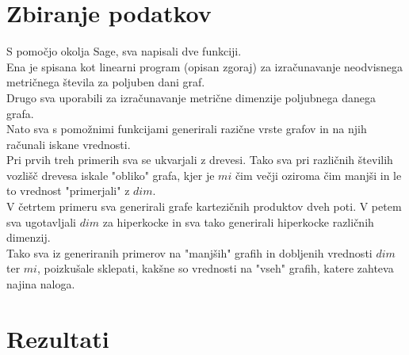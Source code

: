 \documentclass[a4paper]{article}
\begin{document}
\section{Zbiranje podatkov}
S pomočjo okolja Sage, sva napisali dve funkciji.\\
Ena je spisana kot linearni program (opisan zgoraj) za izračunavanje neodvisnega metričnega števila za poljuben dani graf. \\
Drugo sva uporabili za izračunavanje metrične dimenzije poljubnega danega grafa.\\
Nato sva s pomožnimi funkcijami generirali razične vrste grafov in na njih računali iskane vrednosti.\\
Pri prvih treh primerih sva se ukvarjali z drevesi. Tako sva pri različnih številih vozlišč drevesa iskale "obliko" grafa, kjer je $mi$ čim večji oziroma čim manjši in le to vrednost "primerjali" z $dim$.\\
V četrtem primeru sva generirali grafe kartezičnih produktov dveh poti. V petem sva ugotavljali $dim$ za hiperkocke in sva tako generirali hiperkocke različnih dimenzij.\\
Tako sva iz generiranih primerov na "manjših" grafih in dobljenih vrednosti $dim$ ter $mi$, poizkušale sklepati, kakšne so vrednosti na "vseh" grafih, katere zahteva najina naloga.



\section{Rezultati}
\end{document}

